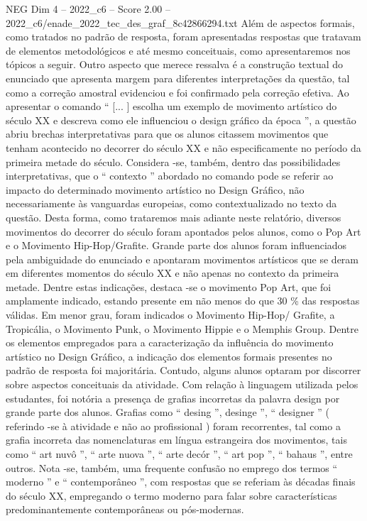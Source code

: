 \begin{textsample}{NEG Dim 4 – 2022\_c6 – Score 2.00 – 2022\_c6/enade\_2022\_tec\_des\_graf\_8c42866294.txt}
Além de aspectos formais, como tratados no padrão de resposta, foram apresentadas respostas que tratavam de elementos metodológicos e até mesmo conceituais, como apresentaremos nos tópicos a seguir.
Outro aspecto que merece ressalva é a construção textual do enunciado que apresenta margem para diferentes interpretações da questão, tal como a correção amostral evidenciou e foi confirmado pela correção efetiva.
Ao apresentar o comando “ [... ] escolha um exemplo de movimento artístico do século XX e descreva como ele influenciou o design gráfico da época ”, a questão abriu brechas interpretativas para que os alunos citassem movimentos que tenham acontecido no decorrer do século XX e não especificamente no período da primeira metade do século.
Considera -se, também, dentro das possibilidades interpretativas, que o “ contexto ” abordado no comando pode se referir ao impacto do determinado movimento artístico no Design Gráfico, não necessariamente às vanguardas europeias, como contextualizado no texto da questão.
Desta forma, como trataremos mais adiante neste relatório, diversos movimentos do decorrer do século foram apontados pelos alunos, como o Pop Art e o Movimento Hip-Hop/Grafite.
Grande parte dos alunos foram influenciados pela ambiguidade do enunciado e apontaram movimentos artísticos que se deram em diferentes momentos do século XX e não apenas no contexto da primeira metade.
Dentre estas indicações, destaca -se o movimento Pop Art, que foi amplamente indicado, estando presente em não menos do que 30 \% das respostas válidas.
Em menor grau, foram indicados o Movimento Hip-Hop/ Grafite, a Tropicália, o Movimento Punk, o Movimento Hippie e o Memphis Group.
Dentre os elementos empregados para a caracterização da influência do movimento artístico no Design Gráfico, a indicação dos elementos formais presentes no padrão de resposta foi majoritária.
Contudo, alguns alunos optaram por discorrer sobre aspectos conceituais da atividade.
Com relação à linguagem utilizada pelos estudantes, foi notória a presença de grafias incorretas da palavra design por grande parte dos alunos.
Grafias como “ desing ”, desinge ”, “ designer ” ( referindo -se à atividade e não ao profissional ) foram recorrentes, tal como a grafia incorreta das nomenclaturas em língua estrangeira dos movimentos, tais como “ art nuvô ”, “ arte nuova ”, “ arte decór ”, “ art pop ”, “ bahaus ”, entre outros.
Nota -se, também, uma frequente confusão no emprego dos termos “ moderno ” e “ contemporâneo ”, com respostas que se referiam às décadas finais do século XX, empregando o termo moderno para falar sobre características predominantemente contemporâneas ou pós-modernas.

\end{textsample}
